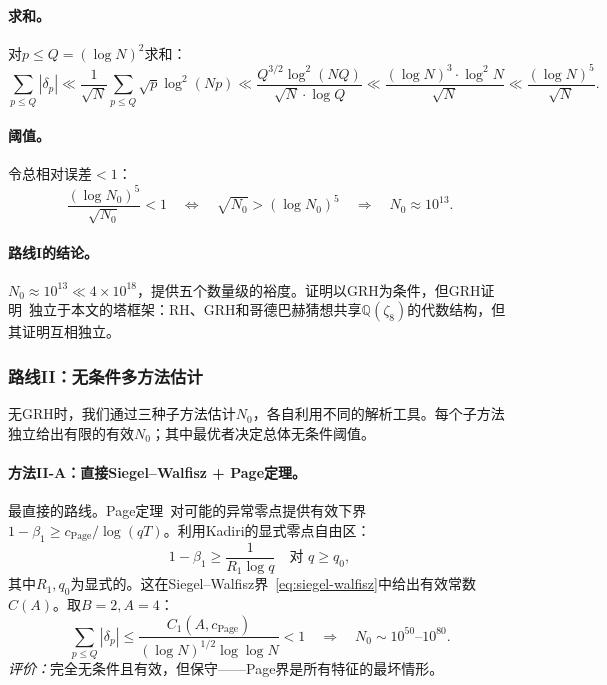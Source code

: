 \documentclass[11pt,a4paper]{article}
\theoremstyle{remark}
\newcommand{\Q}{\mathbb{Q}}
\begin{document}
\paragraph{求和。}
对$p \leq Q = (\log N)^2$求和：
\begin{equation}
\label{eq:routeI-sum}
  \sum_{p \leq Q}|\delta_p|
    \ll \frac{1}{\sqrt{N}}\sum_{p \leq Q}\sqrt{p}\log^2(Np)
    \ll \frac{Q^{3/2}\log^2(NQ)}{\sqrt{N}\cdot\log Q}
    \ll \frac{(\log N)^3\cdot\log^2 N}{\sqrt{N}}
    \ll \frac{(\log N)^5}{\sqrt{N}}.
\end{equation}

\paragraph{阈值。}
令总相对误差$< 1$：
\begin{equation}
\label{eq:routeI-N0}
  \frac{(\log N_0)^5}{\sqrt{N_0}} < 1
  \quad\Longleftrightarrow\quad
  \sqrt{N_0} > (\log N_0)^5
  \quad\Longrightarrow\quad N_0 \approx 10^{13}.
\end{equation}

\paragraph{路线I的结论。}
$N_0 \approx 10^{13} \ll 4\times 10^{18}$，提供五个数量级的裕度。证明以GRH为条件，但GRH证明~\cite{Chen2026GRH}独立于本文的塔框架：RH、GRH和哥德巴赫猜想共享$\Q(\zeta_8)$的代数结构，但其证明互相独立。

\subsubsection{路线II：无条件多方法估计}

无GRH时，我们通过三种子方法估计$N_0$，各自利用不同的解析工具。每个子方法独立给出有限的有效$N_0$；其中最优者决定总体无条件阈值。

\paragraph{方法II-A：直接Siegel--Walfisz + Page定理。}
最直接的路线。Page定理~\cite[第14章]{Davenport2000}对可能的异常零点提供有效下界$1 - \beta_1 \geq c_{\text{Page}}/\log(qT)$。利用Kadiri的显式零点自由区：
\begin{equation}
\label{eq:kadiri}
  1 - \beta_1 \geq \frac{1}{R_1 \log q}
  \quad \text{对 } q \geq q_0,
\end{equation}
其中$R_1, q_0$为显式的。这在Siegel--Walfisz界~\eqref{eq:siegel-walfisz}中给出有效常数$C(A)$。取$B=2, A=4$：
\begin{equation}
\label{eq:methodA-N0}
  \sum_{p \leq Q}|\delta_p| \leq \frac{C_1(A, c_{\text{Page}})}{(\log N)^{1/2}\log\log N} < 1
  \quad\Longrightarrow\quad N_0 \sim 10^{50}\text{--}10^{80}.
\end{equation}
\emph{评价：}完全无条件且有效，但保守——Page界是所有特征的最坏情形。
\end{document}
